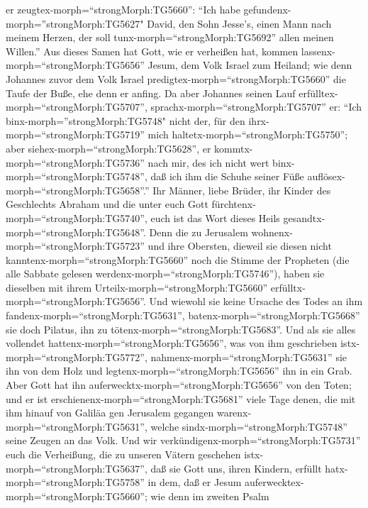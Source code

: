 er zeugtex-morph=``strongMorph:TG5660'': ``Ich habe
gefundenx-morph=''strongMorph:TG5627" David, den Sohn Jesse's, einen
Mann nach meinem Herzen, der soll tunx-morph=``strongMorph:TG5692''
allen meinen Willen.''  Aus dieses Samen hat Gott, wie er
verheißen hat, kommen lassenx-morph=``strongMorph:TG5656'' Jesum, dem
Volk Israel zum Heiland;  wie denn Johannes zuvor dem Volk
Israel predigtex-morph=``strongMorph:TG5660'' die Taufe der Buße, ehe
denn er anfing.  Da aber Johannes seinen Lauf
erfülltex-morph=``strongMorph:TG5707'',
sprachx-morph=``strongMorph:TG5707'' er: ``Ich
binx-morph=''strongMorph:TG5748" nicht der, für den
ihrx-morph=``strongMorph:TG5719'' mich
haltetx-morph=``strongMorph:TG5750''; aber
siehex-morph=``strongMorph:TG5628'', er
kommtx-morph=``strongMorph:TG5736'' nach mir, des ich nicht wert
binx-morph=``strongMorph:TG5748'', daß ich ihm die Schuhe seiner Füße
auflösex-morph=``strongMorph:TG5658''.''  Ihr Männer, liebe
Brüder, ihr Kinder des Geschlechts Abraham und die unter euch Gott
fürchtenx-morph=``strongMorph:TG5740'', euch ist das Wort dieses Heils
gesandtx-morph=``strongMorph:TG5648''.  Denn die zu
Jerusalem wohnenx-morph=``strongMorph:TG5723'' und ihre Obersten,
dieweil sie diesen nicht kanntenx-morph=``strongMorph:TG5660'' noch die
Stimme der Propheten (die alle Sabbate gelesen
werdenx-morph=``strongMorph:TG5746''), haben sie dieselben mit ihrem
Urteilx-morph=``strongMorph:TG5660''
erfülltx-morph=``strongMorph:TG5656''.  Und wiewohl sie
keine Ursache des Todes an ihm fandenx-morph=``strongMorph:TG5631'',
batenx-morph=``strongMorph:TG5668'' sie doch Pilatus, ihn zu
tötenx-morph=``strongMorph:TG5683''.  Und als sie alles
vollendet hattenx-morph=``strongMorph:TG5656'', was von ihm geschrieben
istx-morph=``strongMorph:TG5772'', nahmenx-morph=``strongMorph:TG5631''
sie ihn von dem Holz und legtenx-morph=``strongMorph:TG5656'' ihn in ein
Grab.  Aber Gott hat ihn
auferwecktx-morph=``strongMorph:TG5656'' von den Toten; 
und er ist erschienenx-morph=``strongMorph:TG5681'' viele Tage denen,
die mit ihm hinauf von Galiläa gen Jerusalem gegangen
warenx-morph=``strongMorph:TG5631'', welche
sindx-morph=``strongMorph:TG5748'' seine Zeugen an das Volk.
 Und wir verkündigenx-morph=``strongMorph:TG5731'' euch die
Verheißung, die zu unseren Vätern geschehen
istx-morph=``strongMorph:TG5637'',  daß sie Gott uns, ihren
Kindern, erfüllt hatx-morph=``strongMorph:TG5758'' in dem, daß er Jesum
auferwecktex-morph=``strongMorph:TG5660''; wie denn im zweiten Psalm

